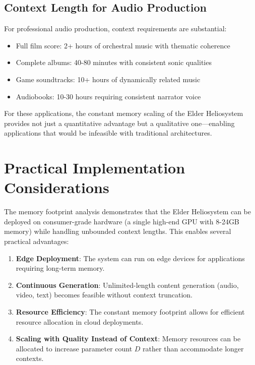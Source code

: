 \subsection{Context Length for Audio Production}

For professional audio production, context requirements are substantial:
\begin{itemize}
    \item Full film score: 2+ hours of orchestral music with thematic coherence
    \item Complete albums: 40-80 minutes with consistent sonic qualities
    \item Game soundtracks: 10+ hours of dynamically related music
    \item Audiobooks: 10-30 hours requiring consistent narrator voice
\end{itemize}

For these applications, the constant memory scaling of the Elder Heliosystem provides not just a quantitative advantage but a qualitative one—enabling applications that would be infeasible with traditional architectures.

\section{Practical Implementation Considerations}

The memory footprint analysis demonstrates that the Elder Heliosystem can be deployed on consumer-grade hardware (a single high-end GPU with 8-24GB memory) while handling unbounded context lengths. This enables several practical advantages:

\begin{enumerate}
    \item \textbf{Edge Deployment}: The system can run on edge devices for applications requiring long-term memory.
    
    \item \textbf{Continuous Generation}: Unlimited-length content generation (audio, video, text) becomes feasible without context truncation.
    
    \item \textbf{Resource Efficiency}: The constant memory footprint allows for efficient resource allocation in cloud deployments.
    
    \item \textbf{Scaling with Quality Instead of Context}: Memory resources can be allocated to increase parameter count $D$ rather than accommodate longer contexts.
\end{enumerate}

